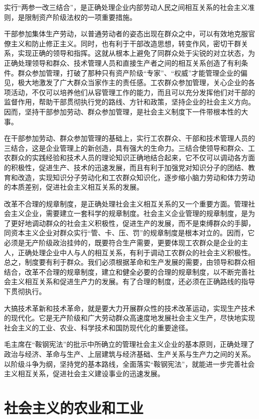 \documentclass{book}
\begin{document}
实行“两参一改三结合”，是正确处理企业内部劳动人民之间相互关系的社会主义准则，是限制资产阶级法权的一项重要措施。

干部参加集体生产劳动，以普通劳动者的姿态出现在群众之中，可以有效地克服官僚主义和防止修正主义。同时，也有利于干部改造思想，转变作风，密切干群关系，实现正确的领导和指挥。这就从根本上避免了同群众处于尖锐的对立状态，为正确处理领导和群众、技术管理人员和直接生产者之间的相互关系创造了有利条件。群众参加管理，打破了那种只有资产阶级“专家”、“权威”才能管理企业的偏见，极大地激发了广大群众当家作主的责任感。工农群众参加管理，关心企业的各项活动，不仅可以培养他们从容管理工作的能力，而且可以充分发挥他们对干部的监督作用，帮助干部贯彻执行党的路线、方针和政策，坚持企业的社会主义方向。因而，坚持干部参加劳动、群众参加管理，是社会主义制度下一件带根本性的大事。

在干部参加劳动、群众参加管理的基础上，实行工农群众、干部和技术管理人员的三结合，这是企业管理上的新创造，具有强大的生命力。三结合使领导和群众、工农群众的实践经验和技术人员的理论知识正确地结合起来，它不仅可以调动各方面的积极性，促进生产、技术的迅速发展，而且有利于加强党对知识分子的团结、教育和改造，实现知识分子劳动化和工农群众知识化，逐步缩小脑力劳动和体力劳动的本质差别，促进社会主义相互关系的发展。

改革不合理的规章制度，是正确处理社会主义相互关系的又一个重要方面。管理社会主义企业，需要建立一套科学的规章制度。社会主义企业管理的规章制度，是为了更好地调动群众的社会主义积极性，促进生产的发展，而不是束缚群众的手脚，同资本主义企业对群众实行“管、卡、压、罚”的规章制度是根本对立的。因而，它必须是无产阶级政治挂帅的，既要符合生产需要，更要体现工农群众是企业的主人，正确处理企业中人与人的相互关系，有利于调动工农群众的社会主义积极性。总之，制度要有利于群众。我们必须根据革命和生产发展的需要，由领导和群众相结合，改革不合理的规章制度，建立和健全必要的合理的规章制度，以不断完善社会主义相互关系和促进生产力的发展。有了合理的制度，还必须在正确路线的指导下贯彻执行。

大搞技术革新和技术革命，就是要大力开展群众性的技术改革运动，实现生产技术的现代化。它是无产阶级和广大劳动群众高速度地发展社会主义生产，尽快地实现社会主义的工业、农业、科学技术和国防现代化的重要途径。

毛主席在“鞍钢宪法”的批示中所确立的管理社会主义企业的基本原则，正确处理了政治与经济、革命与生产、上层建筑与经济基础、生产关系与生产力之间的关系。以阶级斗争为纲，坚持党的基本路线，全面落实“鞍钢宪法”，就能进一步完善社会主义相互关系，促进社会主义建设事业的迅速发展。

\chapter{社会主义的农业和工业}
\end{document}
